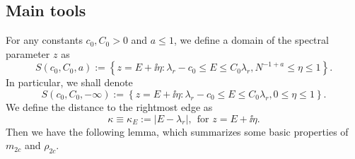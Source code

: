 \subsection{Main tools}\label{sec_tools}

For any constants $c_0,C_0>0$ and $a \le 1$, we define a domain of the spectral parameter $z$ as
\begin{equation}
S(c_0,C_0,a):= \left\{z=E+ \ii \eta: \lambda_r - c_0 \leq E \leq C_0 \lambda_r, N^{-1+a} \leq \eta \leq 1 \right\}. \label{SSET1}
\end{equation}
In particular, we shall denote
\begin{equation}
S(c_0,C_0,-\infty):= \left\{z=E+ \ii \eta: \lambda_r - c_0 \leq E \leq C_0 \lambda_r, 0 \leq \eta \leq 1 \right\}.
\end{equation}
We define the distance to the rightmost edge as
\begin{equation}
\kappa \equiv \kappa_E := \vert E -\lambda_r\vert , \ \ \text{for } z= E+\ii \eta.\label{KAPPA}
\end{equation}
Then we have the following lemma, which summarizes some basic properties of $m_{2c}$ and $\rho_{2c}$.

